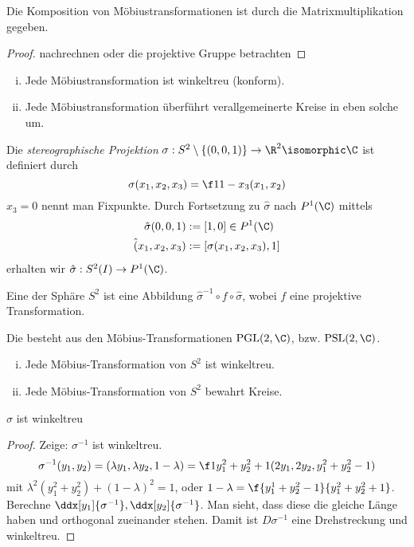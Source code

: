\begin{lem}
	Die Komposition von Möbiustransformationen ist durch die Matrixmultiplikation gegeben.
	\begin{proof}
		nachrechnen oder die projektive Gruppe betrachten
	\end{proof}
\end{lem}

\begin{st}
	\begin{enumerate}[(i)]
		\item
			Jede Möbiustransformation ist winkeltreu (konform).
		\item
			Jede Möbiustransformation überführt verallgemeinerte Kreise in eben solche um.
	\end{enumerate}
\end{st}

\begin{df}
	Die \emph{stereographische Projektion} $\sigma: S^2 \setminus \{ (0, 0, 1) \} \to \R^2 \isomorphic \C$ ist definiert durch
	\[
		\sigma(x_1, x_2, x_3) = \f 1{1-x_3} (x_1, x_2)
	\]
	$x_3 = 0$ nennt man Fixpunkte.
	Durch Fortsetzung zu $\hat \sigma$ nach $P^1(\C)$ mittels
	\begin{align*}
		\hat \sigma(0,0,1) &:= [1, 0] \in P^1(\C) \\
		\hat (x_1, x_2, x_3) &:= [\sigma(x_1, x_2, x_3), 1]
	\end{align*}
	erhalten wir $\hat \sigma: S^2(I) \to P^1(\C)$.
\end{df}

\begin{df}
	Eine  der Sphäre $S^2$ ist eine Abbildung $\hat \sigma^{-1} \circ f \circ \hat \sigma$, wobei $f$ eine projektive Transformation.

	Die  besteht aus den Möbius-Transformationen $\PGL(2, \C)$, bzw. $\PSL(2, \C)$.
\end{df}

\begin{st}
	\begin{enumerate}[(i)]
		\item
			Jede Möbius-Transformation von $S^2$ ist winkeltreu.
		\item
			Jede Möbius-Transformation von $S^2$ bewahrt Kreise.
	\end{enumerate}
\end{st}

\begin{lem}
	$\sigma$ ist winkeltreu
	\begin{proof}
		Zeige: $\sigma^{-1}$ ist winkeltreu.
		\[
			\sigma^{-1}(y_1, y_2)
			= (\lambda y_1, \lambda y_2, 1 - \lambda)
			= \f 1{y_1^2 + y_2^2 + 1} (2y_1, 2y_2, y_1^2 + y_2^2 - 1)
		\]
		mit $\lambda^2 (y_1^2 + y_2^2) + (1-\lambda)^2 = 1$, oder $1 - \lambda = \f{y_1^1 + y_2^2 - 1}{y_1^2 + y_2^2 + 1}$.
		Berechne $\ddx[y_1]{\sigma^{-1}}, \ddx[y_2]{\sigma^{-1}}$.
		Man sieht, dass diese die gleiche Länge haben und orthogonal zueinander stehen.
		Damit ist $D \sigma^{-1}$ eine Drehstreckung und winkeltreu.
	\end{proof}
\end{lem}

